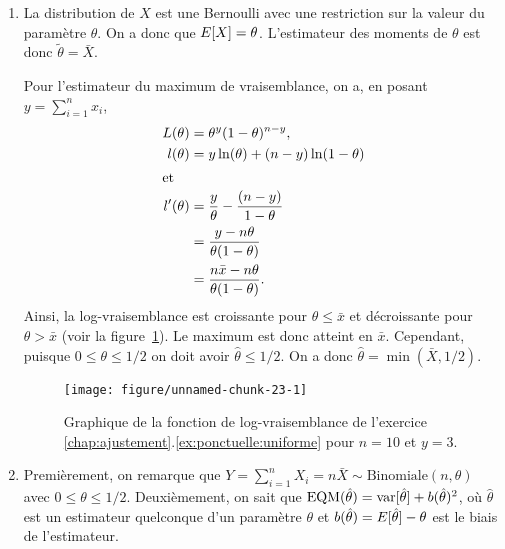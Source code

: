 \begin{solution}{4.15}
    \begin{enumerate}
    \item La distribution de $X$ est une Bernoulli avec une
      restriction sur la valeur du paramètre $\theta$. On a donc que
      $E [ X ] = \theta$. L'estimateur des moments de $\theta$ est
      donc $\tilde{\theta} = \bar{X}$.

      Pour l'estimateur du maximum de vraisemblance, on a, en posant
      $y = \sum_{i = 1}^n x_i$,
      \begin{align*}
        L(\theta) &= \theta^{y} (1 - \theta)^{n - y}, \\
        l(\theta) &= y \ln(\theta) + (n - y) \ln(1 - \theta) \\
        \intertext{et}
        l^\prime(\theta) &= \frac{y}{\theta} - \frac{(n - y)}{1 - \theta}\\
        &= \frac{y - n\theta}{\theta (1 - \theta)}\\
        &= \frac{n \bar{x} - n \theta}{\theta (1 - \theta)}.
      \end{align*}
      Ainsi, la log-vraisemblance est croissante pour $\theta \leq
      \bar{x}$ et décroissante pour $\theta > \bar{x}$ (voir la
      figure~\ref{fig:ponctuelle:uniforme}). Le maximum est donc
      atteint en $\bar{x}$. Cependant, puisque $0 \leq \theta \leq
      1/2$ on doit avoir $\hat{\theta} \leq 1/2$. On a donc
      $\hat{\theta} = \min(\bar{X}, 1/2)$.
      \begin{figure}
        \centering
\begin{knitrout}
\color{fgcolor}
\texttt{[image: figure/unnamed-chunk-23-1]}

\end{knitrout}
        \caption{Graphique de la fonction de log-vraisemblance de
          l'exercice
          \ref{chap:ajustement}.\ref{ex:ponctuelle:uniforme} pour $n =
          10$ et $y = 3$.}
        \label{fig:ponctuelle:uniforme}
      \end{figure}
    \item Premièrement, on remarque que $Y = \sum_{i = 1}^n X_i = n
      \bar{X} \sim \text{Binomiale}(n, \theta)$ avec $0 \leq \theta
      \leq 1/2$. Deuxièmement, on sait que $\mbox{EQM}(\hat{\theta}) =
      \mathrm{var} [ \hat{\theta} ] + b(\hat{\theta})^2$, où $\hat{\theta}$ est
      un estimateur quelconque d'un paramètre $\theta$ et
      $b(\hat{\theta}) = E [ \hat{\theta} ] - \theta$ est le biais de
      l'estimateur.


\end{enumerate}
\end{solution}
